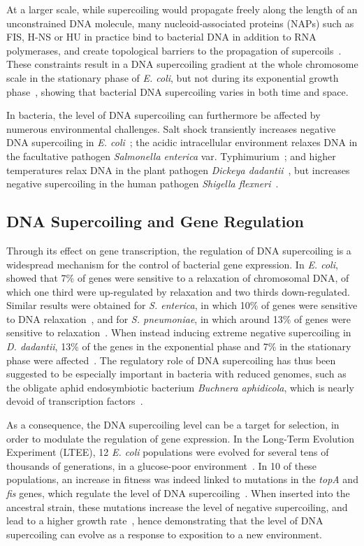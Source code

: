 At a larger scale, while supercoiling would propagate freely along the length of an unconstrained DNA molecule, many nucleoid-associated proteins (NAPs) such as FIS, H-NS or HU in practice bind to bacterial DNA in addition to RNA polymerases, and create topological barriers to the propagation of supercoils~\citep{travers2005a}.
These constraints result in a DNA supercoiling gradient at the whole chromosome scale in the stationary phase of \emph{E. coli}, but not during its exponential growth phase~\citep{lal2016}, showing that bacterial DNA supercoiling varies in both time and space.

In bacteria, the level of DNA supercoiling can furthermore be affected by numerous environmental challenges.
Salt shock transiently increases negative DNA supercoiling in \emph{E. coli}~\citep{hsieh1991}; the acidic intracellular environment relaxes DNA in the facultative pathogen \emph{Salmonella enterica} var. Typhimurium~\citep{marshall2000}; and higher temperatures relax DNA in the plant pathogen \emph{Dickeya dadantii}~\citep{herault2014}, but increases negative supercoiling in the human pathogen \emph{Shigella flexneri}~\citep{tobe1995}.

\subsection{DNA Supercoiling and Gene Regulation}

Through its effect on gene transcription, the regulation of DNA supercoiling is a widespread mechanism for the control of bacterial gene expression.
In \emph{E. coli},~\cite{peter2004} showed that 7\% of genes were sensitive to a relaxation of chromosomal DNA, of which one third were up-regulated by relaxation and two thirds down-regulated.
Similar results were obtained for \emph{S. enterica}, in which 10\% of genes were sensitive to DNA relaxation~\citep{webber2013}, and for \emph{S. pneumoniae}, in which around 13\% of genes were sensitive to relaxation~\citep{ferrandiz2010}.
When instead inducing extreme negative supercoiling in \emph{D. dadantii}, 13\% of the genes in the exponential phase and 7\% in the stationary phase were affected~\citep{pineau2022}.
The regulatory role of DNA supercoiling has thus been suggested to be especially important in bacteria with reduced genomes, such as the obligate aphid endosymbiotic bacterium \emph{Buchnera aphidicola}, which is nearly devoid of transcription factors~\citep{brinza2013}.

As a consequence, the DNA supercoiling level can be a target for selection, in order to modulate the regulation of gene expression.
In the Long-Term Evolution Experiment (LTEE), 12 \emph{E. coli} populations were evolved for several tens of thousands of generations, in a glucose-poor environment~\citep{lenski1991}.
In 10 of these populations, an increase in fitness was indeed linked to mutations in the \emph{topA} and \emph{fis} genes, which regulate the level of DNA supercoiling~\citep{crozat2010}.
When inserted into the ancestral strain, these mutations increase the level of negative supercoiling, and lead to a higher growth rate~\citep{crozat2005}, hence demonstrating that the level of DNA supercoiling can evolve as a response to exposition to a new environment.

